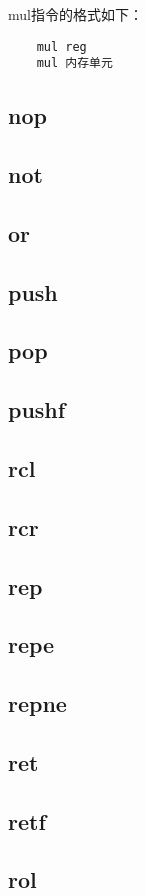 \documentclass[a4paper,left=2.5cm,right=2.5cm,11pt]{article}
\begin{document}
	mul指令的格式如下：
	\begin{lstlisting}
	mul reg
	mul 内存单元
	\end{lstlisting}
	
\subsection{nop}
\subsection{not}
\subsection{or}
\subsection{push}
\subsection{pop}
\subsection{pushf}
\subsection{rcl}
\subsection{rcr}
\subsection{rep}
\subsection{repe}
\subsection{repne}
\subsection{ret}
\subsection{retf}
\subsection{rol}
\end{document}
